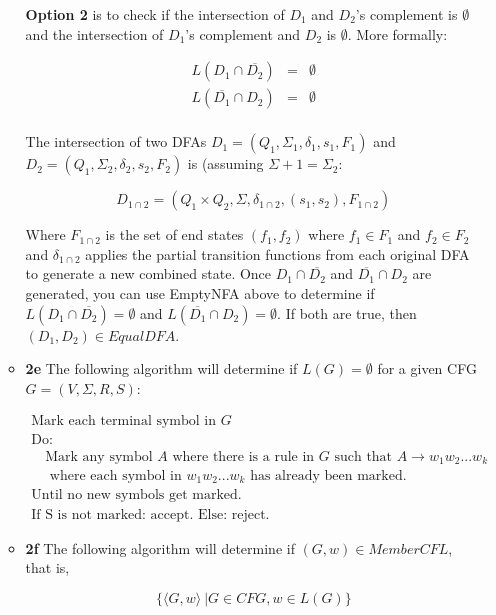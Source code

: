 \documentclass[12pt]{article}
\begin{document}
\begin{enumerate}
\begin{itemize}
\textbf{Option 2} is to check if the intersection of $D_1$ and $D_2$'s complement is $\emptyset$ and the intersection of $D_1$'s complement and $D_2$ is $\emptyset$. More formally:

\[
\begin{array}{lcr}
L(D_1 \cap \overline{D_2}) & = & \emptyset \\
L(\overline{D_1} \cap D_2) & = & \emptyset \\
\end{array} 
\]

The intersection of two DFAs $D_1 = (Q_1, \Sigma_1, \delta_1, s_1, F_1)$ and $D_2 = (Q_1, \Sigma_2, \delta_2, s_2, F_2)$ is (assuming $\Sigma+1 = \Sigma_2: $

\begin{equation*}
D_{1\cap 2} = (Q_1 \times Q_2, \Sigma, \delta_{1\cap 2}, (s_1,s_2), F_{1\cap 2})
\end{equation*}

Where $F_{1\cap 2}$ is the set of end states $(f_1,f_2)$ where $f_1 \in F_1$ and $f_2 \in F_2$ and $\delta_{1\cap2}$ applies the partial transition functions from each original DFA to generate a new combined state. Once $D_1 \cap \overline{D_2}$ and $\overline{D_1} \cap D_2$ are generated, you can use EmptyNFA above to determine if $L(D_1 \cap \overline{D_2}) = \emptyset$ and $L(\overline{D_1} \cap D_2) = \emptyset$. If both are true, then $(D_1,D_2) \in EqualDFA$.

\item \textbf{2e} The following algorithm will determine if $L(G) = \emptyset$ for a given CFG $G = (V,\Sigma, R, S)$:

\[
\begin{array}{l}
\textrm{Mark each terminal symbol in }G \\
\textrm{Do:} \\
\quad \textrm{Mark any symbol $A$ where there is a rule in $G$ such that }A \rightarrow w_1w_2...w_k \\
\quad \textrm{ where each symbol in $w_1w_2...w_k$ has already been marked.} \\
\textrm{Until no new symbols get marked.} \\
\textrm{If S is not marked: accept. Else: reject.}
\end{array}
\]

\item \textbf{2f} The following algorithm will determine if $(G,w) \in MemberCFL$, that is,

\begin{equation}
\{\langle G,w\rangle\ | G \in CFG, w \in L(G)\}
\end{equation}


\end{itemize}
\end{enumerate}
\end{document}

